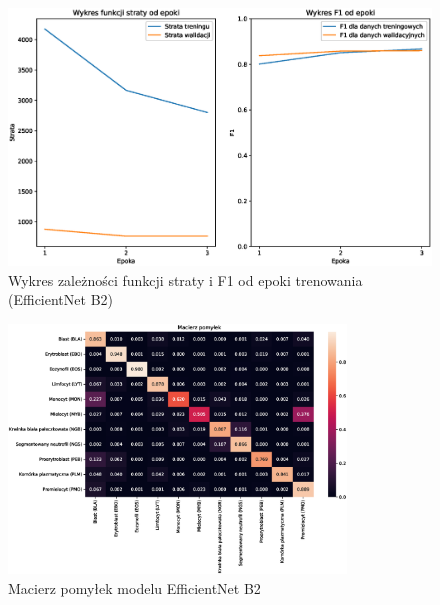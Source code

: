 \begin{figure}
    \centering
    \includegraphics[width=\textwidth]{experiments/efficientnet_b2/combined}
    \caption{Wykres zależności funkcji straty i F1 od epoki trenowania (EfficientNet B2)}
    \label{fig:plot_efficientnet_b2}
\end{figure}
\begin{figure}
    \centering
    \includegraphics[width=0.8\textwidth]{experiments/efficientnet_b2/confusion_matrix}
    \caption{Macierz pomyłek modelu EfficientNet B2}
    \label{fig:confusion_efficientnet_b2}
\end{figure}

